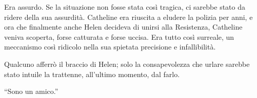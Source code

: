 \documentclass[a4paper,oneside,11pt]{memoir}
\begin{document}
Era assurdo. Se la situazione non fosse stata così tragica, ci sarebbe stato da ridere della sua
assurdità. Catheline era riuscita a eludere la polizia per anni, e ora che finalmente anche Helen
decideva di unirsi alla Resistenza, Catheline veniva scoperta, forse catturata e forse uccisa. Era
tutto così surreale, un meccanismo così ridicolo nella sua spietata precisione e infallibilità.

Qualcuno afferrò il braccio di Helen; solo la consapevolezza che urlare sarebbe stato intuile la
trattenne, all'ultimo momento, dal farlo.

``Sono un amico.''
\end{document}
